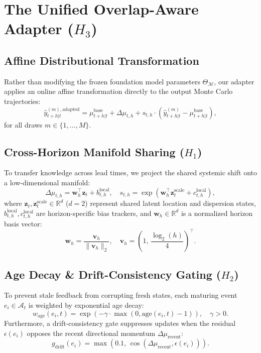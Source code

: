\documentclass[10pt,journal,compsoc]{IEEEtran}
\begin{document}
\section{The Unified Overlap-Aware Adapter ($H_3$)}

\subsection{Affine Distributional Transformation}
Rather than modifying the frozen foundation model parameters $\Theta_{\mathcal{M}}$, our adapter applies an online affine transformation directly to the output Monte Carlo trajectories:
\begin{equation}
\hat{y}_{t+h|t}^{(m), \text{adapted}} = \mu_{t+h|t}^{\text{base}} + \Delta \mu_{t,h} + s_{t,h} \cdot \left( \hat{y}_{t+h|t}^{(m)} - \mu_{t+h|t}^{\text{base}} \right),
\end{equation}
for all draws $m \in \{1, \dots, M\}$.

\subsection{Cross-Horizon Manifold Sharing ($H_1$)}
To transfer knowledge across lead times, we project the shared systemic shift onto a low-dimensional manifold:
\begin{equation}
\Delta \mu_{t,h} = \mathbf{w}_h^\top \mathbf{z}_t + b_{t,h}^{\text{local}}, \quad s_{t,h} = \exp\left( \mathbf{w}_h^\top \mathbf{z}_t^{\text{scale}} + c_{t,h}^{\text{local}} \right),
\end{equation}
where $\mathbf{z}_t, \mathbf{z}_t^{\text{scale}} \in \mathbb{R}^d$ ($d=2$) represent shared latent location and dispersion states, $b_{t,h}^{\text{local}}, c_{t,h}^{\text{local}}$ are horizon-specific bias trackers, and $\mathbf{w}_h \in \mathbb{R}^d$ is a normalized horizon basis vector:
\begin{equation}
\mathbf{w}_h = \frac{\mathbf{v}_h}{\|\mathbf{v}_h\|_2}, \quad \mathbf{v}_h = \left(1, \, \frac{\log_2(h)}{4}\right)^\top.
\end{equation}

\subsection{Age Decay \& Drift-Consistency Gating ($H_2$)}
To prevent stale feedback from corrupting fresh states, each maturing event $e_i \in \mathcal{A}_t$ is weighted by exponential age decay:
\begin{equation}
w_{\text{age}}(e_i, t) = \exp\left( -\gamma \cdot \max(0, \text{age}(e_i, t) - 1) \right), \quad \gamma > 0.
\end{equation}
Furthermore, a drift-consistency gate suppresses updates when the residual $\epsilon(e_i)$ opposes the recent directional momentum $\Delta \mu_{\text{recent}}$:
\begin{equation}
g_{\text{drift}}(e_i) = \max\left(0.1, \, \cos(\Delta \mu_{\text{recent}}, \epsilon(e_i))\right).
\end{equation}
\end{document}
